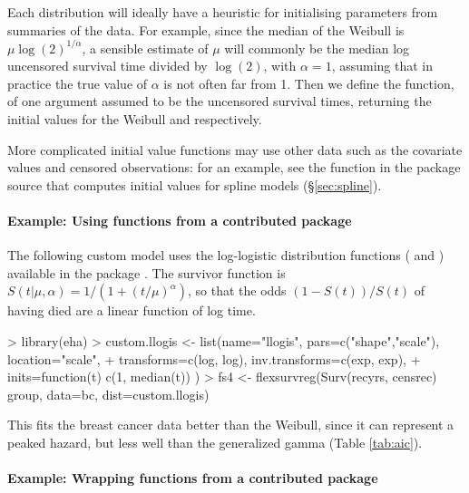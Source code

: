 \documentclass[nojss,nofooter]{jss}
\begin{document}
\begin{description}
  Each distribution will ideally have a heuristic for initialising
  parameters from summaries of the data.  For example, since the
  median of the Weibull is $\mu \log(2)^{1/\alpha}$, a sensible
  estimate of $\mu$ will commonly be the median log uncensored
  survival time divided by $\log(2)$, with $\alpha=1$, assuming that
  in practice the true value of $\alpha$ is not often far from 1.  Then
  we define the function, of one argument  assumed to be the
  uncensored survival times, returning the initial values for the
  Weibull  and  respectively.

  
  More complicated initial value functions may use other data such
  as the covariate values and censored observations: for an example,
  see the function  in the package source
  that computes initial values for spline models
  (\S\ref{sec:spline}).

\end{description}
    
\paragraph{Example: Using functions from a contributed package}

The following custom model uses the log-logistic distribution functions
( and ) available in the package
.   The survivor function is $S(t|\mu,\alpha) = 1/(1 + (t/\mu)^\alpha)$,
so that the odds $(1-S(t))/S(t)$ of having died are a linear function of log time.
\begin{Schunk}
\begin{Sinput}
> library(eha)
> custom.llogis <- list(name="llogis",  pars=c("shape","scale"), location="scale",
+                       transforms=c(log, log), inv.transforms=c(exp, exp),
+                       inits=function(t){ c(1, median(t)) })
> fs4 <- flexsurvreg(Surv(recyrs, censrec) ~ group, data=bc, dist=custom.llogis)
\end{Sinput}
\end{Schunk}

This fits the breast cancer data better than the Weibull, since it can
represent a peaked hazard, but less well than the generalized gamma (Table \ref{tab:aic}).


\paragraph{Example: Wrapping functions from a contributed package}
\end{document}
